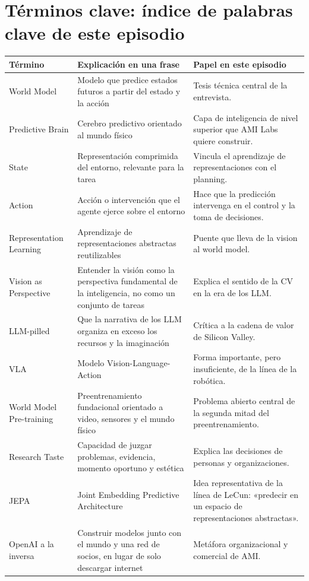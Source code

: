 \section{Términos clave: índice de palabras clave de este episodio}

\begin{longtable}{p{}p{}p{}}
\toprule
Término & Explicación en una frase & Papel en este episodio \\
\midrule
World Model & Modelo que predice estados futuros a partir del estado y la acción & Tesis técnica central de la entrevista. \\
Predictive Brain & Cerebro predictivo orientado al mundo físico & Capa de inteligencia de nivel superior que AMI Labs quiere construir. \\
State & Representación comprimida del entorno, relevante para la tarea & Vincula el aprendizaje de representaciones con el planning. \\
Action & Acción o intervención que el agente ejerce sobre el entorno & Hace que la predicción intervenga en el control y la toma de decisiones. \\
Representation Learning & Aprendizaje de representaciones abstractas reutilizables & Puente que lleva de la vision al world model. \\
Vision as Perspective & Entender la visión como la perspectiva fundamental de la inteligencia, no como un conjunto de tareas & Explica el sentido de la CV en la era de los LLM. \\
LLM-pilled & Que la narrativa de los LLM organiza en exceso los recursos y la imaginación & Crítica a la cadena de valor de Silicon Valley. \\
VLA & Modelo Vision-Language-Action & Forma importante, pero insuficiente, de la línea de la robótica. \\
World Model Pre-training & Preentrenamiento fundacional orientado a video, sensores y el mundo físico & Problema abierto central de la segunda mitad del preentrenamiento. \\
Research Taste & Capacidad de juzgar problemas, evidencia, momento oportuno y estética & Explica las decisiones de personas y organizaciones. \\
JEPA & Joint Embedding Predictive Architecture & Idea representativa de la línea de LeCun: «predecir en un espacio de representaciones abstractas». \\
OpenAI a la inversa & Construir modelos junto con el mundo y una red de socios, en lugar de solo descargar internet & Metáfora organizacional y comercial de AMI. \\
\bottomrule
\end{longtable}


